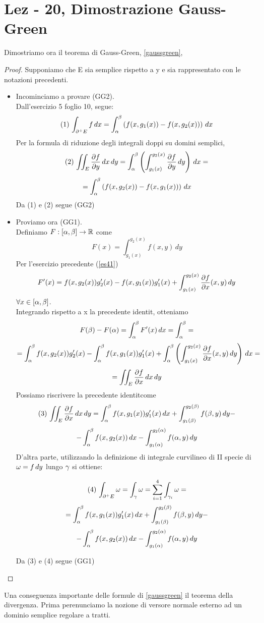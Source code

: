\section{Lez - 20, Dimostrazione Gauss-Green}
Dimostriamo ora il teorema di Gauss-Green, \ref{gaussgreen},
\begin{proof}
  Supponiamo che E sia semplice rispetto a y e sia rappresentato con le 
  notazioni precedenti. \\
  \begin{itemize}
    \item Incominciamo a provare (GG2). \\
          Dall'esercizio 5 foglio 10, segue:
          $$(1)\, \int_{\partial^+ E} f \, dx = \int_{\alpha}^{\beta}\left(f(x,g_1(x))-f(x,g_2(x))\right)\,dx$$
          Per la formula di riduzione degli integrali doppi su domini semplici, 
          $$(2)\, \iint_{E}\frac{\partial f}{\partial y} \,dx\,dy = \int_{\alpha}^{\beta}\left(\int_{g_1(x)}^{g_2(x)} \frac{\partial f}{\partial y} \,dy\right)\,dx = $$
          $$= \int_{\alpha}^{\beta} \left(f(x,g_2(x))-f(x,g_1(x))\right)\,dx$$
          Da (1) e (2) segue (GG2)
    \item Proviamo ora (GG1). \\
          Definiamo $F:[\alpha,\beta]\to\mathbb{R}$ come $$F(x) = \int_{g_1(x)}^{g_2(x)} f(x,y)\,dy$$
          Per l'esercizio precedente (\ref{es41}) 
          $$F'(x) = f(x,g_2(x))g_2'(x) - f(x,g_1(x))g_1'(x) + \int_{g_1(x)}^{g_2(x)} \frac{\partial f}{\partial x}(x,y)\,dy$$
          $\forall x \in [\alpha,\beta]$. \\
          Integrando rispetto a x la precedente identit\aca, otteniamo
          $$F(\beta)-F(\alpha) = \int_{\alpha}^{\beta} F'(x) \,dx = \int_{\alpha}^{\beta} = $$
          $$= \int_{\alpha}^{\beta} f(x,g_2(x))g_2'(x) - 
                \int_{\alpha}^{\beta} f(x,g_1(x))g_1'(x) + \int_{\alpha}^{\beta} \left(\int_{g_1(x)}^{g_2(x)} \frac{\partial f}{\partial x}(x,y)\,dy\right)\,dx = $$
          $$ = \iint_{E} \frac{\partial f}{\partial x}\,dx\,dy$$
          Possiamo riscrivere la precedente identit\aca come 
          $$(3)\, \iint_{E} \frac{\partial f}{\partial x} \,dx\,dy = \int_{\alpha}^{\beta} f(x,g_1(x))g_1'(x) \,dx + 
            \int_{g_1(\beta)}^{g_2(\beta)} f(\beta,y)\,dy - $$
            $$ - \int_{\alpha}^{\beta} f(x,g_2(x))\,dx - \int_{g_1(\alpha)}^{g_2(\alpha)} f(\alpha,y)\,dy$$
          D'altra parte, utilizzando la definizione di integrale curvilineo di 
          II specie di $\omega = f\,dy$ lungo $\gamma$ si ottiene:
          \begin{exercise}
            $$(4)\, \int_{\partial^+ E} \omega = \int_{\gamma} \omega = \sum_{i=1}^{4} \int_{\gamma_i}\omega =  $$
            $$= \int_{\alpha}^{\beta} f(x,g_1(x))g_1'(x) \,dx + 
            \int_{g_1(\beta)}^{g_2(\beta)} f(\beta,y)\,dy - $$
            $$ - \int_{\alpha}^{\beta} f(x,g_2(x))\,dx - \int_{g_1(\alpha)}^{g_2(\alpha)} f(\alpha,y)\,dy$$
          \end{exercise}
          Da (3) e (4) segue (GG1)
  \end{itemize}
\end{proof}
Una conseguenza importante delle formule di \ref{gaussgreen} \ace il teorema della divergenza. 
Prima per\aco enunciamo la nozione di versore normale esterno ad un dominio semplice 
regolare a tratti. 
